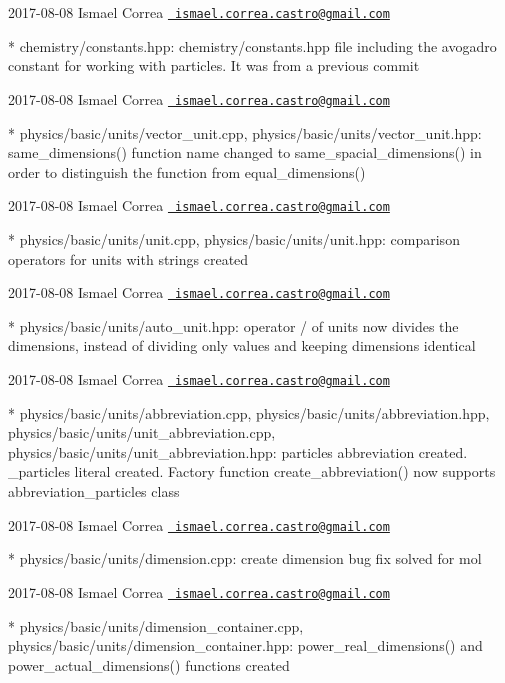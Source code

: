  2017-\/08-\/08 Ismael Correa \href{mailto:ismael.correa.castro@gmail.com}{\texttt{ ismael.\+correa.\+castro@gmail.\+com}} \begin{DoxyVerb}* chemistry/constants.hpp: chemistry/constants.hpp file including
the avogadro constant for working with particles. It was from a
previous commit
\end{DoxyVerb}
 2017-\/08-\/08 Ismael Correa \href{mailto:ismael.correa.castro@gmail.com}{\texttt{ ismael.\+correa.\+castro@gmail.\+com}} \begin{DoxyVerb}* physics/basic/units/vector_unit.cpp,
physics/basic/units/vector_unit.hpp: same_dimensions() function name
changed to same_spacial_dimensions() in order to distinguish the
function from equal_dimensions()
\end{DoxyVerb}
 2017-\/08-\/08 Ismael Correa \href{mailto:ismael.correa.castro@gmail.com}{\texttt{ ismael.\+correa.\+castro@gmail.\+com}} \begin{DoxyVerb}* physics/basic/units/unit.cpp, physics/basic/units/unit.hpp: 
comparison operators for units with strings created
\end{DoxyVerb}
 2017-\/08-\/08 Ismael Correa \href{mailto:ismael.correa.castro@gmail.com}{\texttt{ ismael.\+correa.\+castro@gmail.\+com}} \begin{DoxyVerb}* physics/basic/units/auto_unit.hpp: operator / of units now divides
the dimensions, instead of dividing only values and keeping
dimensions identical
\end{DoxyVerb}
 2017-\/08-\/08 Ismael Correa \href{mailto:ismael.correa.castro@gmail.com}{\texttt{ ismael.\+correa.\+castro@gmail.\+com}} \begin{DoxyVerb}* physics/basic/units/abbreviation.cpp,
physics/basic/units/abbreviation.hpp,
physics/basic/units/unit_abbreviation.cpp,
physics/basic/units/unit_abbreviation.hpp: particles abbreviation
created. _particles literal created. Factory function
create_abbreviation() now supports abbreviation_particles class
\end{DoxyVerb}
 2017-\/08-\/08 Ismael Correa \href{mailto:ismael.correa.castro@gmail.com}{\texttt{ ismael.\+correa.\+castro@gmail.\+com}} \begin{DoxyVerb}* physics/basic/units/dimension.cpp: create dimension bug fix solved
for mol
\end{DoxyVerb}
 2017-\/08-\/08 Ismael Correa \href{mailto:ismael.correa.castro@gmail.com}{\texttt{ ismael.\+correa.\+castro@gmail.\+com}} \begin{DoxyVerb}* physics/basic/units/dimension_container.cpp,
physics/basic/units/dimension_container.hpp: power_real_dimensions()
and power_actual_dimensions() functions created
\end{DoxyVerb}
